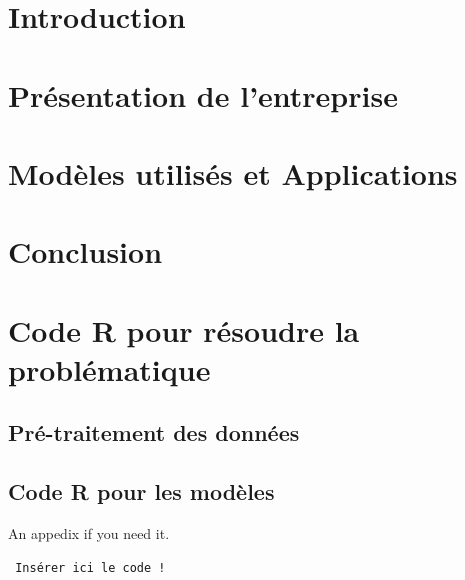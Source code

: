 \documentclass[a4paper, oneside, 12pt, final]{extreport}
\begin{document}

\tableofcontents

\listoffigures


\cleardoublepage

\newpage
{}
\chapter*{Introduction}
\label{chap:general_intorduction}



\chapter{Présentation de l'entreprise}
\label{chap:chapterone}


\chapter{Modèles utilisés et Applications}
\label{chap:2}



\chapter*{Conclusion}
\label{chap:conclusion}



\newpage
\appendix
{}

\chapter{Code R pour résoudre la problématique}
\label{chap:appendix}


\section{Pré-traitement des données}
\section{Code R pour les modèles}

An appedix if you need it.

\begin{verbatim}
 Insérer ici le code !
 \end{verbatim}
\end{document}
